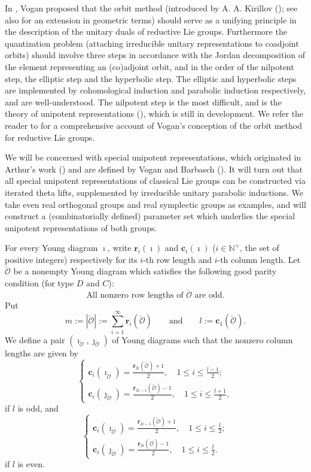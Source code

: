 \documentclass[lang = american]{ems-icm} %
\newcommand{\CO}{{\mathcal {O}}}
\numberwithin{equation}{section}
\theoremstyle{remark}
\begin{document}
In \cite{VoICM}, Vogan proposed that the orbit method (introduced by A. A. Kirillov (\cite{Ki1}); see also \cite{Ko} for an extension in geometric terms) should serve as a unifying principle in the description of the unitary duals of reductive Lie groups. Furthermore the quantization problem (attaching irreducible unitary representations to coadjoint orbits) should involve three steps in accordance with the Jordan decomposition of the element representing an (co)adjoint orbit, and in the order of the nilpotent step, the elliptic step and the hyperbolic step. The elliptic and hyperbolic steps are implemented by cohomological induction and parabolic induction respectively, and are well-understood. The nilpotent step is the most difficult, and is the theory of unipotent representations (\cites{VoAss,VoUni}), which is still in development. We refer the reader to \cite{VoPar} for a comprehensive account of Vogan's conception of the orbit method for reductive Lie groups.

We will be concerned with special unipotent representations, which originated in Arthur's work (\cites{ArPro, ArUni}) and are defined by Vogan and Barbasch (\cites{BV,ABV}).
It will turn out that all special unipotent representations of classical Lie groups can be constructed via iterated theta lifts, supplemented by irreducible unitary parabolic inductions. We take even real orthogonal groups and real symplectic groups as examples, and will construct a (combinatorially defined) parameter set which underlies the special unipotent representations of both groups.

For every Young diagram $\imath$, write $ \mathbf r_i(\imath)$ and $\mathbf c_i(\imath)$ ($i\in \mathbb N^+$, the set of positive integers) respectively for its $i$-th row length and $i$-th column length.  Let $\check \CO$ be a nonempty Young diagram which satisfies the following good parity condition (for type $D$ and $C$):
\begin{equation}\label{GP}
\text{All nonzero row lengths of $\check \CO$ are odd.}
\end{equation}
Put
\[
 m:= |\check \CO |:= \sum_{i=1}^\infty \mathbf r_i(\check \CO)\qquad\textrm{and}\qquad l:=\mathbf c_1(\check \CO).
\]
We define a pair $(\imath_{\check \CO}, \jmath_{\check \CO})$ of Young diagrams such that the nonzero column lengths are given by
\[
   \left\{
     \begin{array}{l}
       \mathbf c_i(\imath_{\check \CO})=\frac{\mathbf r_{2i}(\check \CO)+1}{2}, \quad 1\leq i\leq \frac{l-1}{2}; \\
        \mathbf c_i(\jmath_{\check \CO})=\frac{\mathbf r_{2i-1}(\check \CO)-1}{2}, \quad 1\leq i\leq \frac{l+1}{2},
     \end{array}
   \right.
  \]
if $l$ is odd, and
\[
   \left\{
     \begin{array}{l}
       \mathbf c_i(\imath_{\check \CO})=\frac{\mathbf r_{2i-1}(\check \CO)+1}{2}, \quad 1\leq i\leq \frac{l}{2}; \\
        \mathbf c_i(\jmath_{\check \CO})=\frac{\mathbf r_{2i}(\check \CO)-1}{2}, \quad 1\leq i\leq \frac{l}{2}.
     \end{array}
   \right.
  \]
if $l$ is even.
\end{document}
